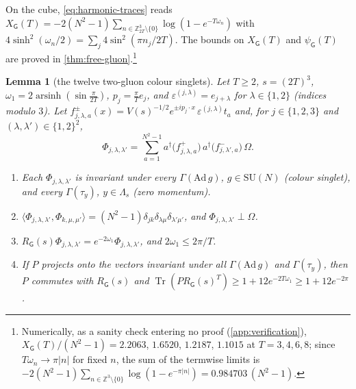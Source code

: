 \documentclass[11pt,a4paper]{amsart}
\newtheorem{lemma}[theorem]{Lemma}
\theoremstyle{definition}
\theoremstyle{remark}
\numberwithin{equation}{section}
\DeclareMathOperator{\Tr}{Tr}        %
\newcommand{\Z}{\mathbb{Z}}          %
\newcommand{\ip}[2]{\langle #1,#2\rangle}  %
\newcommand{\abs}[1]{\lvert #1\rvert}      %
\newcommand{\SU}{\mathrm{SU}}              %
\newcommand{\TT}{\mathbb{T}}               %
\newcommand{\Zc}{\mathcal{Z}}              %
\newcommand{\XT}[2]{X_{#1}(#2)}            %
\newcommand{\psiT}[2]{\psi_{#1}(#2)}       %
\newcommand{\Vol}[1]{V(#1)}                %
\newcommand{\cube}[1]{(2#1)^3}             %
\newcommand{\Gharm}{\mathsf{G}}            %
\begin{document}
On the cube, \eqref{eq:harmonic-traces} reads $\XT{\Gharm}{T}=-2(N^2-1)\sum_{n\in\Z_{2T}^3\setminus\{0\}}\log(1-e^{-T\omega_n})$ with $4\sinh^2(\omega_n/2)=\sum_j4\sin^2(\pi n_j/2T)$. The bounds on $\XT{\Gharm}{T}$ and $\psiT{\Gharm}{T}$ are proved in \cref{thm:free-gluon}.\footnote{Numerically, as a sanity check entering no proof (\cref{app:verification}), $\XT{\Gharm}{T}/(N^2-1)=2.2063$, $1.6520$, $1.2187$, $1.1015$ at $T=3,4,6,8$; since $T\omega_n\to\pi\abs n$ for fixed $n$, the sum of the termwise limits is $-2(N^2-1)\sum_{n\in\Z^3\setminus\{0\}}\log(1-e^{-\pi\abs n})=0.984703\,(N^2-1)$.}

\begin{lemma}[the twelve two-gluon colour singlets]\label{lem:two-gluon-singlets}
Let $T\ge2$, $s=\cube{T}$, $\omega_1=2\operatorname{arsinh}(\sin\frac\pi{2T})$, $p_j=\frac\pi Te_j$, and $\varepsilon^{(j,\lambda)}=e_{j+\lambda}$ for $\lambda\in\{1,2\}$ (indices modulo $3$). Let $f^{\pm}_{j,\lambda,a}(x)=\Vol{s}^{-1/2}e^{\pm ip_j\cdot x}\,\varepsilon^{(j,\lambda)}t_a$ and, for $j\in\{1,2,3\}$ and $(\lambda,\lambda')\in\{1,2\}^2$,
\[
 \Phi_{j,\lambda,\lambda'}=\sum_{a=1}^{N^2-1}a^\dagger\bigl(f^{+}_{j,\lambda,a}\bigr)\,a^\dagger\bigl(f^{-}_{j,\lambda',a}\bigr)\,\Omega .
\]
\begin{enumerate}[label=(\roman*)]
\item Each $\Phi_{j,\lambda,\lambda'}$ is invariant under every $\Gamma(\mathrm{Ad}\,g)$, $g\in\SU(N)$ (colour singlet), and every $\Gamma(\tau_y)$, $y\in\Lambda_s$ (zero momentum).
\item $\ip{\Phi_{j,\lambda,\lambda'}}{\Phi_{k,\mu,\mu'}}=(N^2-1)\delta_{jk}\delta_{\lambda\mu}\delta_{\lambda'\mu'}$, and $\Phi_{j,\lambda,\lambda'}\perp\Omega$.
\item $R_{\Gharm}(s)\Phi_{j,\lambda,\lambda'}=e^{-2\omega_1}\Phi_{j,\lambda,\lambda'}$, and $2\omega_1\le2\pi/T$.
\item If $P$ projects onto the vectors invariant under all $\Gamma(\mathrm{Ad}\,g)$ and $\Gamma(\tau_y)$, then $P$ commutes with $R_{\Gharm}(s)$ and $\Tr(PR_{\Gharm}(s)^T)\ge1+12e^{-2T\omega_1}\ge1+12e^{-2\pi}$.
\end{enumerate}
\end{lemma}
\end{document}
